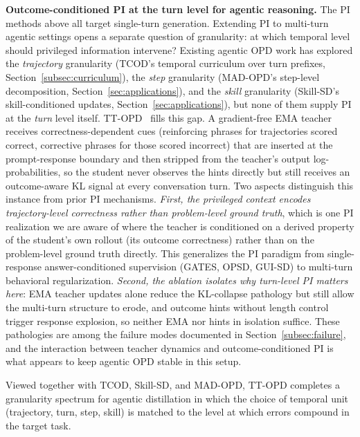 \documentclass{article} %
\begin{document}
\textbf{Outcome-conditioned PI at the turn level for agentic reasoning.} The PI methods above all target single-turn generation. Extending PI to multi-turn agentic settings opens a separate question of granularity: at which temporal level should privileged information intervene? Existing agentic OPD work has explored the \emph{trajectory} granularity (TCOD's temporal curriculum over turn prefixes, Section~\ref{subsec:curriculum}), the \emph{step} granularity (MAD-OPD's step-level decomposition, Section~\ref{sec:applications}), and the \emph{skill} granularity (Skill-SD's skill-conditioned updates, Section~\ref{sec:applications}), but none of them supply PI at the \emph{turn} level itself. TT-OPD~\citep{2605.02943} fills this gap. A gradient-free EMA teacher receives correctness-dependent cues (reinforcing phrases for trajectories scored correct, corrective phrases for those scored incorrect) that are inserted at the prompt-response boundary and then stripped from the teacher's output log-probabilities, so the student never observes the hints directly but still receives an outcome-aware KL signal at every conversation turn. Two aspects distinguish this instance from prior PI mechanisms. \emph{First, the privileged context encodes trajectory-level correctness rather than problem-level ground truth}, which is one PI realization we are aware of where the teacher is conditioned on a derived property of the student's own rollout (its outcome correctness) rather than on the problem-level ground truth directly. This generalizes the PI paradigm from single-response answer-conditioned supervision (GATES, OPSD, GUI-SD) to multi-turn behavioral regularization. \emph{Second, the ablation isolates why turn-level PI matters here}: EMA teacher updates alone reduce the KL-collapse pathology but still allow the multi-turn structure to erode, and outcome hints without length control trigger response explosion, so neither EMA nor hints in isolation suffice. These pathologies are among the failure modes documented in Section~\ref{subsec:failure}, and the interaction between teacher dynamics and outcome-conditioned PI is what appears to keep agentic OPD stable in this setup.

Viewed together with TCOD, Skill-SD, and MAD-OPD, TT-OPD completes a granularity spectrum for agentic distillation in which the choice of temporal unit (trajectory, turn, step, skill) is matched to the level at which errors compound in the target task.
\end{document}
